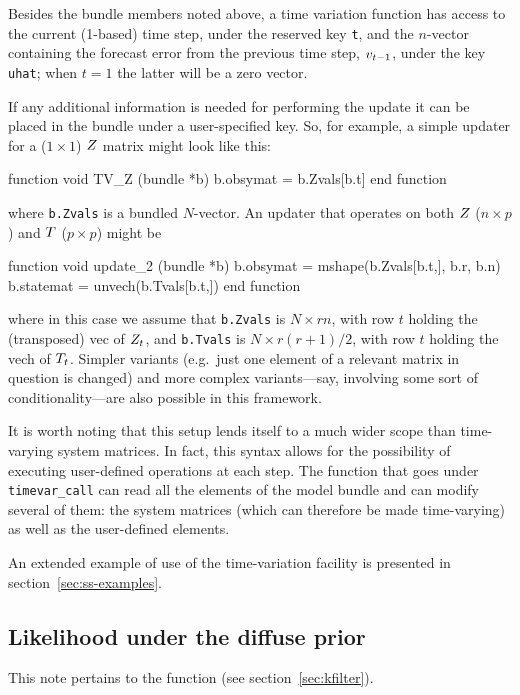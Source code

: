 Besides the bundle members noted above, a time variation function has
access to the current (1-based) time step, under the reserved key
\texttt{t}, and the $n$-vector containing the forecast error from the
previous time step, $v_{t-1}$, under the key \texttt{uhat};
when $t=1$ the latter will be a zero vector.

If any additional information is needed for performing the update it
can be placed in the bundle under a user-specified key.  So, for
example, a simple updater for a ($1 \times 1$) $Z$ matrix might
look like this:
%
\begin{code}
function void TV_Z (bundle *b)
    b.obsymat = b.Zvals[b.t]
end function
\end{code}
%
where \texttt{b.Zvals} is a bundled $N$-vector. An updater that
operates on both $Z$ ($n \times p$) and $T$ ($p \times
p$) might be
%
\begin{code}
function void update_2 (bundle *b)
    b.obsymat = mshape(b.Zvals[b.t,], b.r, b.n)
    b.statemat = unvech(b.Tvals[b.t,])
end function
\end{code}
%
where in this case we assume that \texttt{b.Zvals} is $N \times rn$,
with row $t$ holding the (transposed) vec of $Z_t$, and
\texttt{b.Tvals} is $N \times r(r+1)/2$, with row $t$ holding the vech
of $T_t$. Simpler variants (e.g.\ just one element of a
relevant matrix in question is changed) and more complex
variants---say, involving some sort of conditionality---are also
possible in this framework.

It is worth noting that this setup lends itself to a much wider scope
than time-varying system matrices. In fact, this syntax allows for the
possibility of executing user-defined operations at each step. The
function that goes under \texttt{timevar\_call} can read all the
elements of the model bundle and can modify several of them: the
system matrices (which can therefore be made time-varying) as well as
the user-defined elements.

An extended example of use of the time-variation facility is presented
in section~\ref{sec:ss-examples}.

\subsection{Likelihood under the diffuse prior}
\label{sec:lldiffuse}

This note pertains to the  function (see
section~\ref{sec:kfilter}). 

